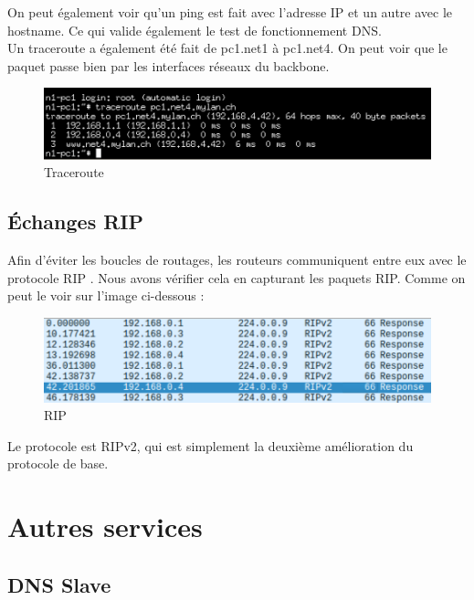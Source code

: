 \documentclass{article}
\begin{document}
On peut également voir qu'un ping est fait avec l'adresse IP et un autre avec le hostname. Ce qui valide également le test de fonctionnement DNS.\\

Un traceroute a également été fait de pc1.net1 à pc1.net4. On peut voir que le paquet passe bien par les interfaces réseaux du backbone.

\begin{figure}[!h]
	\centering
	\includegraphics{./captures/traceroutepc1-net4.png}
	\caption{Traceroute}
	\label{fig:Traceroute}
\end{figure}

\clearpage

\subsection{Échanges RIP}

Afin d'éviter les boucles de routages, les routeurs communiquent entre eux avec le protocole RIP \cite{RIP}. Nous avons vérifier cela en capturant les paquets RIP. Comme on peut le voir sur l'image ci-dessous :

\begin{figure}[!h]
	\centering
	\includegraphics{./captures/rip.png}
	\caption{RIP}
	\label{fig:RIP}
\end{figure}

Le protocole est RIPv2, qui est simplement la deuxième amélioration du protocole de base.

\clearpage
\section{Autres services}

\subsection{DNS Slave}
\end{document}
